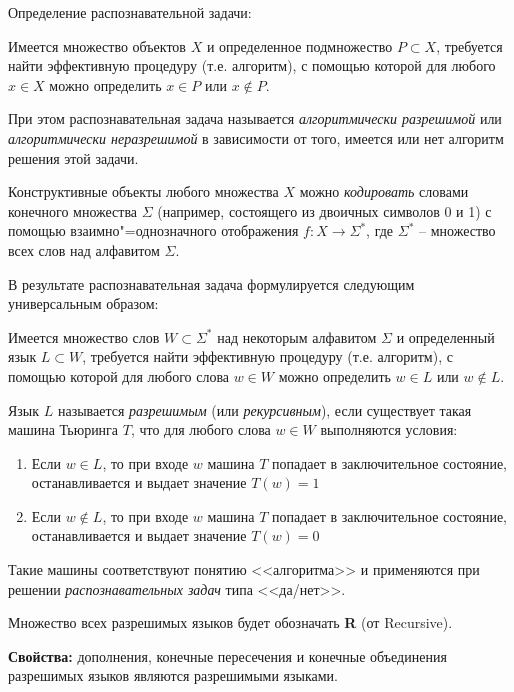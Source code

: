 \begin{definition}
    Определение распознавательной задачи:

    Имеется множество объектов $X$ и определенное подмножество $P\subset X$, требуется найти эффективную процедуру (т.е. алгоритм), с помощью которой для любого $x\in X$ можно определить $x\in P$ или $x \notin P$.

    При этом распознавательная задача называется \textit{алгоритмически разрешимой} или \textit{алгоритмически неразрешимой} в зависимости от того, имеется или нет алгоритм решения этой задачи.
\end{definition}

Конструктивные объекты любого множества $X$ можно \textit{кодировать} словами конечного множества $\Sigma$ (например, состоящего из двоичных символов 0 и 1) с помощью взаимно"=однозначного отображения $f: X\rightarrow\Sigma^*$, где $\Sigma^*$ -- множество всех слов над алфавитом $\Sigma$.

В результате распознавательная задача формулируется следующим универсальным образом:

Имеется множество слов $W\subset\Sigma^*$ над некоторым алфавитом $\Sigma$ и определенный язык $L\subset W$, требуется найти эффективную процедуру (т.е. алгоритм), с помощью которой для любого слова $w\in W$ можно определить $w\in L$ или $w\notin L$.

\begin{definition}
    Язык $L$ называется \textit{разрешимым} (или \textit{рекурсивным}), если существует такая машина Тьюринга $T$, что для любого слова $w\in W$ выполняются условия:
    \begin{enumerate}
        \item Если $w\in L$, то при входе $w$ машина $T$ попадает в заключительное состояние, останавливается и выдает значение $T(w)=1$
        \item Если $w\notin L$, то при входе $w$ машина $T$ попадает в заключительное состояние, останавливается и выдает значение $T(w)=0$
    \end{enumerate}

    Такие машины соответствуют понятию <<алгоритма>> и применяются при решении \textit{распознавательных задач} типа <<да/нет>>.
\end{definition}

Множество всех разрешимых языков будет обозначать \textbf{R} (от Recursive).

\textbf{Свойства: } дополнения, конечные пересечения и конечные объединения разрешимых языков являются разрешимыми языками.

